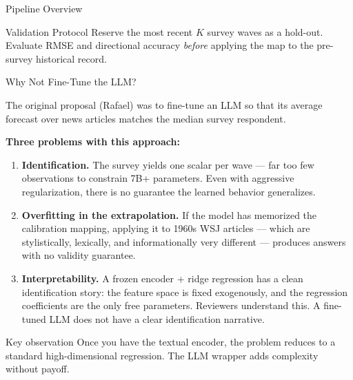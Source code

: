 \documentclass[aspectratio=169, 11pt]{beamer}
\begin{document}
\begin{frame}{Pipeline Overview}
\begin{center}
\begin{tikzpicture}
\end{tikzpicture}
\end{center}

\vspace{0.2cm}
\begin{block}{Validation Protocol}
Reserve the most recent $K$ survey waves as a hold-out. Evaluate RMSE and directional accuracy \emph{before} applying the map to the pre-survey historical record.
\end{block}

\end{frame}

\begin{frame}{Why Not Fine-Tune the LLM?}

The original proposal (Rafael) was to fine-tune an LLM so that its average forecast over news articles matches the median survey respondent.

\vspace{0.3cm}
\textbf{Three problems with this approach:}

\begin{enumerate}
  \item \textbf{Identification.} The survey yields one scalar per wave --- far too few observations to constrain 7B+ parameters. Even with aggressive regularization, there is no guarantee the learned behavior generalizes.

  \item \textbf{Overfitting in the extrapolation.} If the model has memorized the calibration mapping, applying it to 1960s WSJ articles --- which are stylistically, lexically, and informationally very different --- produces answers with no validity guarantee.

  \item \textbf{Interpretability.} A frozen encoder + ridge regression has a clean identification story: the feature space is fixed exogenously, and the regression coefficients are the only free parameters. Reviewers understand this. A fine-tuned LLM does not have a clear identification narrative.
\end{enumerate}

\vspace{0.1cm}
\begin{alertblock}{Key observation}
Once you have the textual encoder, the problem reduces to a standard high-dimensional regression. The LLM wrapper adds complexity without payoff.
\end{alertblock}

\end{frame}
\end{document}
